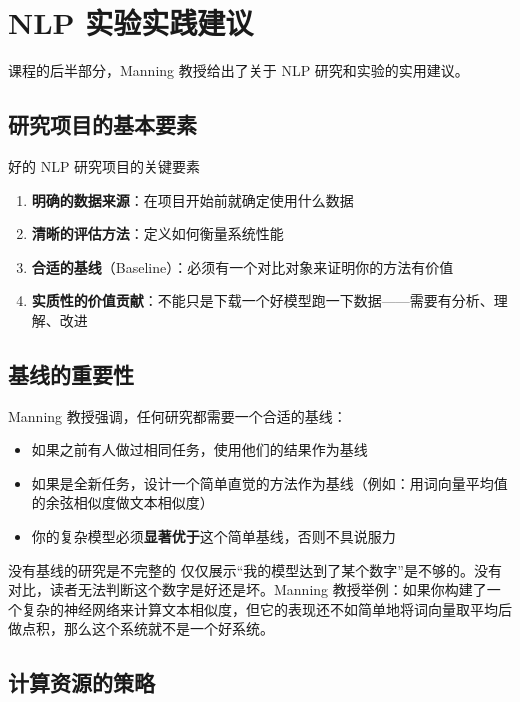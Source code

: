 \section{NLP 实验实践建议}

课程的后半部分，Manning 教授给出了关于 NLP 研究和实验的实用建议。

\subsection{研究项目的基本要素}

\begin{importantbox}{好的 NLP 研究项目的关键要素}
\begin{enumerate}
    \item \textbf{明确的数据来源}：在项目开始前就确定使用什么数据
    \item \textbf{清晰的评估方法}：定义如何衡量系统性能
    \item \textbf{合适的基线}（Baseline）：必须有一个对比对象来证明你的方法有价值
    \item \textbf{实质性的价值贡献}：不能只是下载一个好模型跑一下数据——需要有分析、理解、改进
\end{enumerate}
\end{importantbox}

\subsection{基线的重要性}

Manning 教授强调，任何研究都需要一个合适的基线：

\begin{itemize}
    \item 如果之前有人做过相同任务，使用他们的结果作为基线
    \item 如果是全新任务，设计一个简单直觉的方法作为基线（例如：用词向量平均值的余弦相似度做文本相似度）
    \item 你的复杂模型必须\textbf{显著优于}这个简单基线，否则不具说服力
\end{itemize}

\begin{warningbox}{没有基线的研究是不完整的}
仅仅展示``我的模型达到了某个数字''是不够的。没有对比，读者无法判断这个数字是好还是坏。Manning 教授举例：如果你构建了一个复杂的神经网络来计算文本相似度，但它的表现还不如简单地将词向量取平均后做点积，那么这个系统就不是一个好系统。
\end{warningbox}

\subsection{计算资源的策略}


